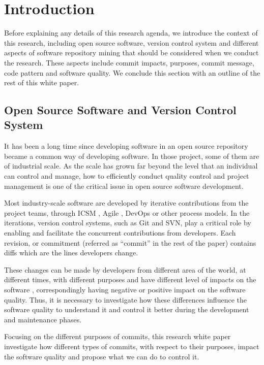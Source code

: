 \section{Introduction}
\label{sec:introduction}

Before explaining any details of this research agenda, we introduce the context of this research, including open source software, version control system and different aspects of software repository mining that should be considered when we conduct the research. 
These aspects include commit impacts, purposes, commit message, code pattern and software quality.
We conclude this section with an outline of the rest of this white paper. 

\subsection{Open Source Software and Version Control System}
It has been a long time since developing software in an open source repository became a common way of developing software. 
In those project, some of them are of industrial scale.
As the scale has grown far beyond the level that an individual can control and manage, how to efficiently conduct quality control and project management is one of the critical issue in open source software development.

Most industry-scale software are developed by iterative contributions from the project teams, through ICSM \cite{icsm2014}, Agile \cite{agile2004}, DevOps \cite{devops2016} or other process models. 
In the iterations, version control systems, such as Git and SVN, play a critical role by enabling and facilitate the concurrent contributions from developers.
Each revision, or commitment (referred as ``commit'' in the rest of the paper) contains diffs which are the lines developers change.

These changes can be made by developers from different area of the world, at different times, with different purposes and have different level of impacts on the software \cite{qrs2020}, correspondingly having negative or positive impact on the software quality. 
Thus, it is necessary to investigate how these differences influence the software quality to understand it and control it better during the development and maintenance phases. 

Focusing on the different purposes of commits, this research white paper investigate how different types of commits, with respect to their purposes, impact the software quality and propose what we can do to control it. 


